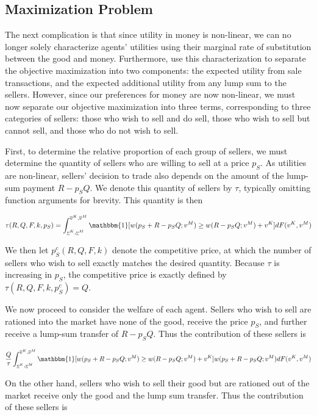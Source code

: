 \documentclass[AER]{AEA}
\begin{document}
\subsection{Maximization Problem}

The next complication is that since utility in money is non-linear, we can no longer solely characterize agents' utilities using their marginal rate of substitution between the good and money. Furthermore, \cite{dworczak-2020} use this characterization to separate the objective maximization into two components: the expected utility from sale transactions, and the expected additional utility from any lump sum to the sellers. However, since our preferences for money are now non-linear, we must now separate our objective maximization into three terms, corresponding to three categories of sellers: those who  wish to sell and do sell, those who wish to sell but cannot sell, and those who do not wish to sell.

First, to determine the relative proportion of each group of sellers, we must determine the quantity of sellers who are willing to sell at a price $p_S$. As utilities are non-linear, sellers' decision to trade also depends on the amount of the lump-sum payment $R - p_S Q$. We denote this quantity of sellers by $\tau$, typically omitting function arguments for brevity. This quantity is then

$$
\tau(R, Q, F, k, p_S) = \int_{\underline{v}^K, \underline{v}^M}^{\overline{v}^K, \overline{v}^M} \mathbbm{1}[w(p_S + R - p_SQ; v^M) \ge w(R - p_S Q ; v^M) + v^K] dF(v^K, v^M)
$$

We then let $p_S^c(R, Q, F, k)$ denote the competitive price, at which the number of sellers who wish to sell exactly matches the desired quantity. Because $\tau$ is increasing in $p_S$, the competitive price is exactly defined by $\tau(R, Q, F, k, p_S^c) = Q$.

We now proceed to consider the welfare of each agent. Sellers who wish to sell are rationed into the market have none of the good, receive the price $p_S$, and further receive a lump-sum transfer of $R - p_S Q$. Thus the contribution of these sellers is

\begin{equation}
    \frac{Q}{\tau} \int_{\underline{v}^K, \underline{v}^M}^{\overline{v}^K, \overline{v}^M} \mathbbm{1}[w(p_S + R - p_SQ; v^M) \ge w(R - p_S Q ; v^M) + v^K] w(p_S + R - p_SQ; v^M) dF(v^K, v^M)
\end{equation}

On the other hand, sellers who wish to sell their good but are rationed out of the market receive only the good and the lump sum transfer. Thus the contribution of these sellers is
\end{document}
